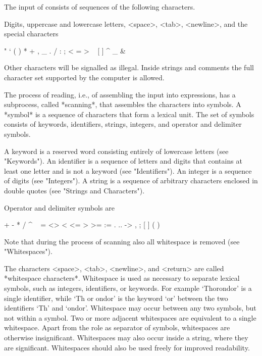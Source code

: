 
The input of {\GAP} consists of sequences of the following characters.

Digits, uppercase and lowercase letters, <space>, <tab>, <newline>, and
the special characters

\begintt
"    `    (    )    *    +    ,    _
.    /    :    ;    <    =    >    ~
[    ]    ^    _    {    }    &
\endtt

Other characters will be signalled as illegal.  Inside strings and
comments the full character set supported by the computer is allowed.


The process of reading, i.e., of assembling the input into expressions,
has a subprocess, called *scanning*, that assembles the characters into
symbols.  A *symbol* is a sequence of characters that form a lexical
unit. The set of symbols consists of keywords, identifiers, strings,
integers, and operator and delimiter symbols.

A keyword is a reserved word consisting entirely of lowercase letters
(see "Keywords"). An identifier is a sequence of letters and digits that
contains at least one letter and is not a keyword (see "Identifiers").
An integer is a sequence of digits (see "Integers").  A string is a
sequence of  arbitrary characters  enclosed in double quotes (see
"Strings and Characters").

Operator and delimiter symbols are

\begintt
+    -    *    /    ^    ~
=    <>   <    <=   >    >=
:=   .    ..   ->   ,    ;
[    ]    {    }    (    )
\endtt

Note that during the process of scanning also all whitespace is removed
(see "Whitespaces").


The  characters <space>, <tab>,  <newline>, and  <return> are called
*whitespace characters*.  Whitespace is used  as necessary to separate
lexical symbols, such as integers, identifiers, or keywords. For example
`Thorondor' is a single identifier, while `Th or ondor' is the keyword
`or' between the two identifiers `Th' and `ondor'. Whitespace may occur
between any two symbols, but not within a symbol. Two or more adjacent
whitespaces are equivalent to a single whitespace. Apart from the role
as separator of symbols, whitespaces are  otherwise insignificant.
Whitespaces may also occur inside a string, where they are significant.
Whitespaces should also be used freely for improved readability.

